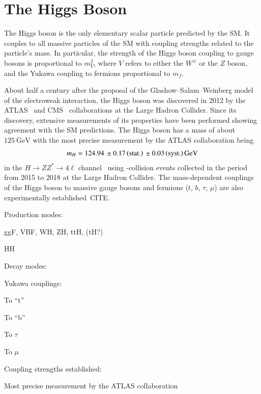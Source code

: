 \section{The Higgs Boson}

The Higgs boson is the only elementary scalar particle predicted by the SM. It
couples to all massive particles of the SM with coupling strengths related to
the particle's mass. In particular, the strength of the Higgs boson coupling to
gauge bosons is proportional to $m_V^2$, where $V$ refers to either the $W^\pm$
or the $Z$ boson, and the Yukawa coupling to fermions proportional to $m_{f}$.

About half a century after the proposal of the Glashow--Salam--Weinberg model of
the electroweak interaction, the Higgs boson was discovered in 2012 by the
ATLAS~\cite{HIGG-2012-27} and CMS~\cite{CMS-HIG-12-028} collaborations at the
Large Hadron Collider. Since its discovery, extensive measurements of its
properties have been performed showing agreement with the SM predictions. The
Higgs boson has a mass of about $\SI{125}{\GeV}$ with the most precise
measurement by the ATLAS collaboration being
\begin{align*}
  m_{H} = \num{124.94}%
  \valuesep\numerrt{0.17}{stat.}%
  \valuesep\numerrt{0.03}{syst.}%
  \valuesep\si{\GeV}
\end{align*}
in the $H \to Z Z^{*} \to 4\ell$ channel~\cite{HIGG-2020-07} using \pp-collision
events collected in the period from 2015 to 2018 at the Large Hadron Collider.
The mass-dependent couplings of the Higgs boson to massive gauge bosons and
fermions ($t$, $b$, $\tau$, $\mu$) are also experimentally established~CITE.





Production modes:

ggF, VBF, WH, ZH, ttH, (tH?)

HH

Decay modes:

Yukawa couplings:

To ``t''

To ``b''

To $\tau$

To $\mu$



Coupling strengths established:





Most precise measurement by the ATLAS collaboration


